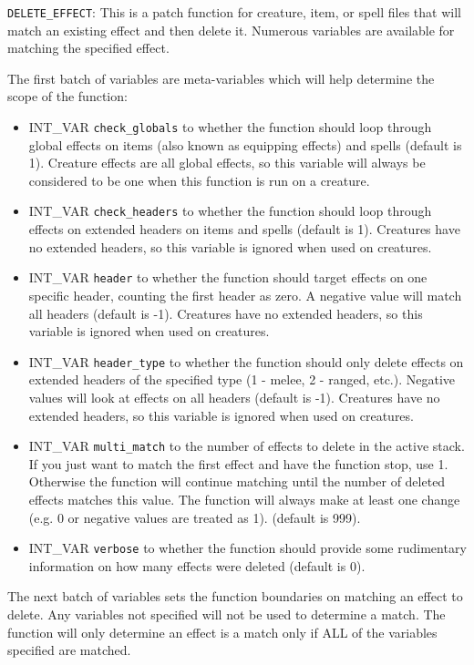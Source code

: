 \documentclass{article}
\begin{document}
\verb+DELETE_EFFECT+: This is a patch function for creature, item, or spell files that will match an existing effect and then delete it. Numerous variables are available for matching the specified effect.

The first batch of variables are meta-variables which will help determine the scope of the function:

\begin{itemize}
\item INT_VAR \verb+check_globals+ to whether the function should loop through global effects on items (also known as equipping effects) and spells (default is 1). Creature effects are all global effects, so this variable will always be considered to be one when this function is run on a creature.
\item INT_VAR \verb+check_headers+ to whether the function should loop through effects on extended headers on items and spells (default is 1). Creatures have no extended headers, so this variable is ignored when used on creatures.
\item INT_VAR \verb+header+ to whether the function should target effects on one specific header, counting the first header as zero. A negative value will match all headers (default is -1). Creatures have no extended headers, so this variable is ignored when used on creatures.
\item INT_VAR \verb+header_type+ to whether the function should only delete effects on extended headers of the specified type (1 - melee, 2 - ranged, etc.). Negative values will look at effects on all headers (default is -1). Creatures have no extended headers, so this variable is ignored when used on creatures.
\item INT_VAR \verb+multi_match+ to the number of effects to delete in the active stack. If you just want to match the first effect and have the function stop, use 1. Otherwise the function will continue matching until the number of deleted effects matches this value. The function will always make at least one change (e.g. 0 or negative values are treated as 1). (default is 999).
\item INT_VAR \verb+verbose+ to whether the function should provide some rudimentary information on how many effects were deleted (default is 0).
\end{itemize}

The next batch of variables sets the function boundaries on matching an effect to delete. Any variables not specified will not be used to determine a match. The function will only determine an effect is a match only if ALL of the variables specified are matched.
\end{document}
